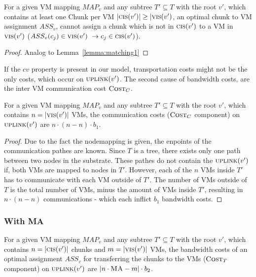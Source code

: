 \documentclass[9pt,twocolumn]{scrartcl}
\newcommand{\Chunk}{\ensuremath{c}}
\newcommand{\MaFactor}{\ensuremath{\textsc{MA}}}
\newcommand{\VmChunkAssignment}{\ensuremath{ASS_v}}
\newcommand{\NodeMapping}{\ensuremath{MAP_v}}
\newcommand{\SubstrateNode}{\ensuremath{v}}
\newcommand{\Cost}{\textsc{Cost}}
\newcommand{\Tree}{\ensuremath{T}}
\newcommand{\CostCom}{\ensuremath{b_1}}
\newcommand{\CostTrans}{\ensuremath{b_2}}
\newcommand{\Vms}{\ensuremath{n}}
\begin{document}
\begin{lemma}
\label{lemma:matching2}
For a given VM mapping $\NodeMapping$ and any subtree $\Tree' \subseteq
\Tree$ with the root $\SubstrateNode'$, which contains at least one Chunk per
VM $|\ChunkCount(\SubstrateNode')| \geq |\VmCount(\SubstrateNode')$, an
optimal chunk to VM assignment $\VmChunkAssignment$, cannot assign a chunk
which is not in $\ChunkCount(\SubstrateNode')$ to a VM in
$\VmCount(\SubstrateNode')$ ($\VmChunkAssignment(\Chunk_j) \in
\VmCount(\SubstrateNode')~ \rightarrow \Chunk_j \in
\ChunkCount(\SubstrateNode')$).
\end{lemma}

\begin{proof}
 Analog to Lemma~\ref{lemma:matching1}
\end{proof}

If the $cv$ property is present in our model, transportation costs might not be
the only costs, which occur on $\Uplink(\SubstrateNode')$. The second cause of
bandwidth costs, are the inter VM communication cost $\Cost_C$.

\begin{corollary}
\label{corollary:comCost}
 For a given VM mapping $\NodeMapping$ and any subtree $\Tree' \subseteq
\Tree$ with the root $\SubstrateNode'$, which contains $n
= |\VmCount(\SubstrateNode')|$ VMs, the communication costs ($\Cost_C$
component) on
$\Uplink(\SubstrateNode')$ are $n \cdot (\Vms - n)
\cdot
\CostCom$.
\end{corollary}

\begin{proof}
Due to the fact the nodemapping is given, the enpoints of the communication
pathes are known. Since $\Tree$ is a tree, there exists only one path between
two nodes in the substrate. These pathes do not contain the
$\Uplink(\SubstrateNode')$ if, both VMs are mapped to nodes in $\Tree'$.
However, each of the $n$ VMs inside $\Tree'$ has to communicate with each VM
outside of $\Tree'$. The number of VMs outside of $\Tree$ is the total number
of VMs, minus the amount of VMs inside $\Tree'$, resulting in $n \cdot (\Vms -
n)$ communications - which each inflict $\CostCom$ bandwidth costs.
\end{proof}

\subsubsection{With MA}

\begin{corollary}
\label{corollary:local_matching}
For a given VM mapping $\NodeMapping$ and any subtree $\Tree' \subseteq
\Tree$ with the root $\SubstrateNode'$, which contains $n =
|\ChunkCount(\SubstrateNode')|$ chunks and $m = |\VmCount(\SubstrateNode')|$
VMs, the bandwidth costs of an optimal assignment $\VmChunkAssignment$ for
transferring the chunks to the VMs ($\Cost_T$
component) on $\Uplink(\SubstrateNode')$ are $|n\cdot\MaFactor
- m| \cdot \CostTrans$.
\end{corollary}
\end{document}
